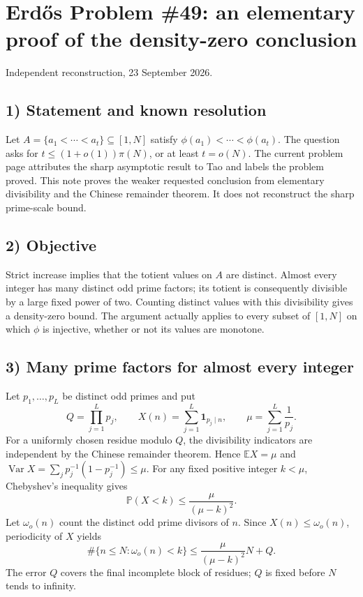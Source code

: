 \section{Erd\H{o}s Problem \#49: an elementary proof of the density-zero conclusion}
\noindent Independent reconstruction, 23 September 2026.

\subsection*{1) Statement and known resolution}
Let $A=\{a_1<\cdots<a_t\}\subseteq[1,N]$ satisfy $\phi(a_1)<\cdots<\phi(a_t)$. The question asks for $t\le(1+o(1))\pi(N)$, or at least $t=o(N)$. The current problem page attributes the sharp asymptotic result to Tao and labels the problem proved. This note proves the weaker requested conclusion from elementary divisibility and the Chinese remainder theorem. It does not reconstruct the sharp prime-scale bound.

\subsection*{2) Objective}
Strict increase implies that the totient values on $A$ are distinct. Almost every integer has many distinct odd prime factors; its totient is consequently divisible by a large fixed power of two. Counting distinct values with this divisibility gives a density-zero bound. The argument actually applies to every subset of $[1,N]$ on which $\phi$ is injective, whether or not its values are monotone.

\subsection*{3) Many prime factors for almost every integer}
Let $p_1,\ldots,p_L$ be distinct odd primes and put
\[
 Q=\prod_{j=1}^L p_j,\qquad
 X(n)=\sum_{j=1}^L\mathbf1_{p_j\mid n},\qquad
 \mu=\sum_{j=1}^L\frac1{p_j}.
\]
For a uniformly chosen residue modulo $Q$, the divisibility indicators are independent by the Chinese remainder theorem. Hence $\mathbb EX=\mu$ and $\operatorname{Var}X=\sum_jp_j^{-1}(1-p_j^{-1})\le\mu$. For any fixed positive integer $k<\mu$, Chebyshev's inequality gives
\[
 \mathbb P(X<k)\le\frac{\mu}{(\mu-k)^2}.\tag{1}
\]
Let $\omega_o(n)$ count the distinct odd prime divisors of $n$. Since $X(n)\le\omega_o(n)$, periodicity of $X$ yields
\[
 \#\{n\le N:\omega_o(n)<k\}
 \le\frac{\mu}{(\mu-k)^2}N+Q.\tag{2}
\]
The error $Q$ covers the final incomplete block of residues; $Q$ is fixed before $N$ tends to infinity.

